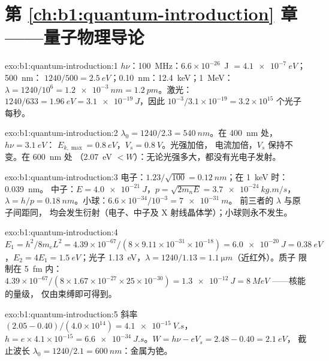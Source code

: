 \section*{第 \ref{ch:b1:quantum-introduction} 章——量子物理导论}

\begin{solution}{exo:b1:quantum-introduction:1}
$h\nu$：\qty{100}{MHz}：$6.6 \times 10^{-26}$~J $= \qty{4.1e-7}{eV}$；\qty{500}{nm}：
$1240/500 = \qty{2.5}{eV}$；\qty{0.10}{nm}：\qty{12.4}{keV}；\qty{1}{MeV}：$\lambda =
1240/10^6 = \qty{1.2e-3}{nm} = \qty{1.2}{pm}$。激光：$1240/633 = \qty{1.96}{eV} =
\qty{3.1e-19}{J}$，因此 $10^{-3}/3.1 \times 10^{-19} = 3.2 \times 10^{15}$ 个光子
每秒。
\end{solution}

\begin{solution}{exo:b1:quantum-introduction:2}
$\lambda_0 = 1240/2.3 = \qty{540}{nm}$。在 \qty{400}{nm} 处，$h\nu = \qty{3.1}{eV}$：
$E_{k,\max} = \qty{0.8}{eV}$，$V_s = \qty{0.8}{V}$。光强加倍，
电流加倍，$V_s$ 保持不变。在 \qty{600}{nm} 处
（\qty{2.07}{eV} $< W$）：无论光强多大，都没有光电子发射。
\end{solution}

\begin{solution}{exo:b1:quantum-introduction:3}
电子：$1.23/\sqrt{100} = \qty{0.12}{nm}$；在 \qty{1}{keV} 时：\qty{0.039}{nm}。
中子：$E = \qty{4.0e-21}{J}$，$p = \sqrt{2m_nE} = \qty{3.7e-24}{kg.m/s}$，
$\lambda = h/p = \qty{0.18}{nm}$。小球：$6.6 \times 10^{-34}/10^{-3} = \qty{7e-31}{m}$。
前三者的 $\lambda$ 与原子间距同，
均会发生衍射（电子、中子及 X 射线晶体学）；小球则永不发生。
\end{solution}

\begin{solution}{exo:b1:quantum-introduction:4}
$E_1 = h^2/8m_eL^2 = 4.39 \times 10^{-67}/(8 \times 9.11 \times 10^{-31} \times 10^{-18}) =
\qty{6.0e-20}{J} = \qty{0.38}{eV}$，$E_2 = 4E_1 = \qty{1.5}{eV}$；光子
\qty{1.13}{eV}，$\lambda = 1240/1.13 = \qty{1.1}{\micro m}$（近红外）。质子
限制在 \qty{5}{fm} 内：$4.39 \times 10^{-67}/(8 \times 1.67 \times 10^{-27} \times 25 \times 10^{-30}) =
\qty{1.3e-12}{J} = \qty{8}{MeV}$ ——核能的量级，
仅由束缚即可得到。
\end{solution}

\begin{solution}{exo:b1:quantum-introduction:5}
斜率 $(2.05 - 0.40)/(4.0 \times 10^{14}) = \qty{4.1e-15}{V.s}$，$h = e \times 4.1 \times
10^{-15} = \qty{6.6e-34}{J.s}$。$W = h\nu - eV_s = 2.48 - 0.40 = \qty{2.1}{eV}$，
截止波长 $\lambda_0 = 1240/2.1 = \qty{600}{nm}$：金属为铯。
\end{solution}

